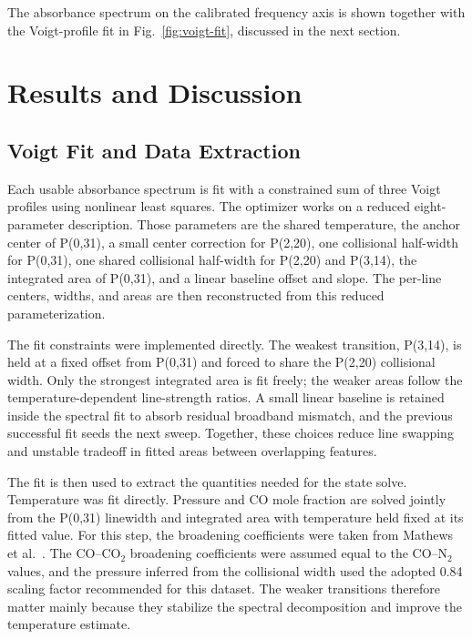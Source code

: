 \documentclass[12pt,letterpaper]{article}
\begin{document}
The absorbance spectrum on the calibrated frequency axis is shown together with the Voigt-profile fit in Fig.~\ref{fig:voigt-fit}, discussed in the next section.

\section{Results and Discussion}

\subsection*{Voigt Fit and Data Extraction}

Each usable absorbance spectrum is fit with a constrained sum of three Voigt profiles using nonlinear least squares. The optimizer works on a reduced eight-parameter description. Those parameters are the shared temperature, the anchor center of P(0,31), a small center correction for P(2,20), one collisional half-width for P(0,31), one shared collisional half-width for P(2,20) and P(3,14), the integrated area of P(0,31), and a linear baseline offset and slope. The per-line centers, widths, and areas are then reconstructed from this reduced parameterization.

The fit constraints were implemented directly. The weakest transition, P(3,14), is held at a fixed offset from P(0,31) and forced to share the P(2,20) collisional width. Only the strongest integrated area is fit freely; the weaker areas follow the temperature-dependent line-strength ratios. A small linear baseline is retained inside the spectral fit to absorb residual broadband mismatch, and the previous successful fit seeds the next sweep. Together, these choices reduce line swapping and unstable tradeoff in fitted areas between overlapping features.

The fit is then used to extract the quantities needed for the state solve. Temperature was fit directly. Pressure and CO mole fraction are solved jointly from the P(0,31) linewidth and integrated area with temperature held fixed at its fitted value. For this step, the broadening coefficients were taken from Mathews et al.\ \cite{mathews2021highbandwidth}. The CO--CO$_2$ broadening coefficients were assumed equal to the CO--N$_2$ values, and the pressure inferred from the collisional width used the adopted 0.84 scaling factor recommended for this dataset. The weaker transitions therefore matter mainly because they stabilize the spectral decomposition and improve the temperature estimate.
\end{document}
